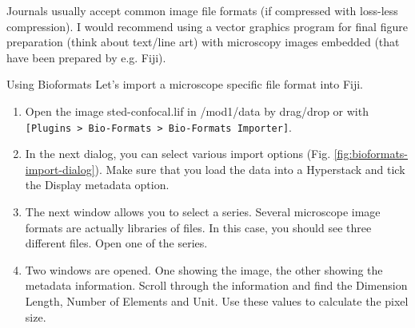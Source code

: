 Journals usually accept common image file formats (if compressed with loss-less compression). I would recommend using a vector graphics program for final figure preparation (think about text/line art) with microscopy images embedded (that have been prepared by e.g. Fiji).

\begin{taskbox}{Using Bioformats}
Let's import a microscope specific file format into Fiji.

\begin{enumerate}
	\item Open the image sted-confocal.lif in /mod1/data by drag/drop or with \texttt{[Plugins > Bio-Formats > Bio-Formats Importer]}.  
	\item In the next dialog, you can select various import options (Fig. \ref{fig:bioformats-import-dialog}). Make sure that you load the data into a Hyperstack and tick the Display metadata option.
	
	\begin{minipage}[t]{\linewidth}
		\begin{center}
		\medskip
		\label{fig:bioformats-import-dialog}
		\end{center}
	\end{minipage}
	
	\item The next window allows you to select a series. Several microscope image formats are actually libraries of files. In this case, you should see three different files. Open one of the series.
	\item Two windows are opened. One showing the image, the other showing the metadata information. Scroll through the information and find the Dimension Length, Number of Elements and Unit. Use these values to calculate the pixel size.
\end{enumerate}

\end{taskbox}

